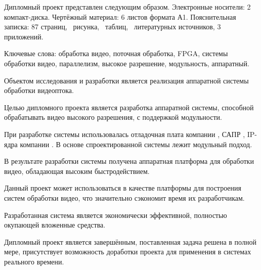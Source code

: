 \thispagestyle{empty}

Дипломный проект представлен следующим образом. Электронные носители: 2 компакт-диска.
Чертёжный материал: 6 листов формата А1. Пояснительная записка: 87 страниц, \totfig{}~рисунка,
\tottab{}~таблиц, \totref{}~литературных источников, 3 приложений.

Ключевые слова: обработка видео, поточная обработка, FPGA, системы обработки видео,
параллелизм, высокое разрешение, модульность, аппаратный.

Объектом исследования и разработки является реализация аппаратной системы обработки видеоптока.

Целью дипломного проекта является разработка аппаратной системы, способной обрабатывать видео высокого
разрешения, с поддержкой модульности.

При разработке системы использовалась отладочная плата компании , САПР ,
IP-ядра компании . В основе спроектированной системы лежит модульный подход.

В результате разработки системы получена аппаратная платформа для обработки видео, обладающая высоким
быстродействием.

Данный проект может использоваться в качестве платформы для построения систем обработки видео,
что значительно сэкономит время их разработчикам.

Разработанная система является экономически эффективной, полностью окупающей вложенные средства.

Дипломный проект является завершённым, поставленная задача решена в полной мере, присутствует возможность
доработки проекта для применения в системах реального времени.

\clearpage
